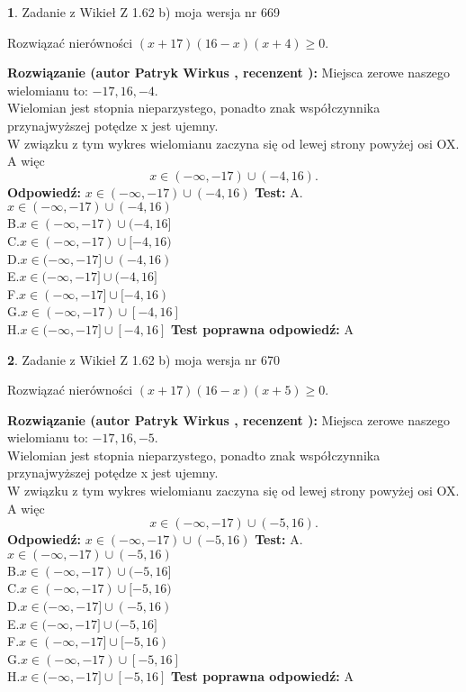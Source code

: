\documentclass[12pt, a4paper]{article}
\theoremstyle{definition} %
\newtheorem{zad}{}
\newcommand{\zadStart}[1]{\begin{zad}#1\newline}
\newcommand{\zadStop}{\end{zad}}
\newcommand{\rozwStart}[2]{\noindent \textbf{Rozwiązanie (autor #1 , recenzent #2): }\newline}
\newcommand{\rozwStop}{\newline}
\newcommand{\odpStart}{\noindent \textbf{Odpowiedź:}\newline}
\newcommand{\odpStop}{\newline}
\newcommand{\testStart}{\noindent \textbf{Test:}\newline}
\newcommand{\testStop}{\newline}
\newcommand{\kluczStart}{\noindent \textbf{Test poprawna odpowiedź:}\newline}
\newcommand{\kluczStop}{\newline}
\begin{document}
\zadStart{Zadanie z Wikieł Z 1.62 b) moja wersja nr 669}

Rozwiązać nierówności $(x+17)(16-x)(x+4)\ge0$.
\zadStop
\rozwStart{Patryk Wirkus}{}
Miejsca zerowe naszego wielomianu to: $-17, 16, -4$.\\
Wielomian jest stopnia nieparzystego, ponadto znak współczynnika przy\linebreak najwyższej potędze x jest ujemny.\\ W związku z tym wykres wielomianu zaczyna się od lewej strony powyżej osi OX. A więc $$x \in (-\infty,-17) \cup (-4,16).$$
\rozwStop
\odpStart
$x \in (-\infty,-17) \cup (-4,16)$
\odpStop
\testStart
A.$x \in (-\infty,-17) \cup (-4,16)$\\
B.$x \in (-\infty,-17) \cup (-4,16]$\\
C.$x \in (-\infty,-17) \cup [-4,16)$\\
D.$x \in (-\infty,-17] \cup (-4,16)$\\
E.$x \in (-\infty,-17] \cup (-4,16]$\\
F.$x \in (-\infty,-17] \cup [-4,16)$\\
G.$x \in (-\infty,-17) \cup [-4,16]$\\
H.$x \in (-\infty,-17] \cup [-4,16]$
\testStop
\kluczStart
A
\kluczStop



\zadStart{Zadanie z Wikieł Z 1.62 b) moja wersja nr 670}

Rozwiązać nierówności $(x+17)(16-x)(x+5)\ge0$.
\zadStop
\rozwStart{Patryk Wirkus}{}
Miejsca zerowe naszego wielomianu to: $-17, 16, -5$.\\
Wielomian jest stopnia nieparzystego, ponadto znak współczynnika przy\linebreak najwyższej potędze x jest ujemny.\\ W związku z tym wykres wielomianu zaczyna się od lewej strony powyżej osi OX. A więc $$x \in (-\infty,-17) \cup (-5,16).$$
\rozwStop
\odpStart
$x \in (-\infty,-17) \cup (-5,16)$
\odpStop
\testStart
A.$x \in (-\infty,-17) \cup (-5,16)$\\
B.$x \in (-\infty,-17) \cup (-5,16]$\\
C.$x \in (-\infty,-17) \cup [-5,16)$\\
D.$x \in (-\infty,-17] \cup (-5,16)$\\
E.$x \in (-\infty,-17] \cup (-5,16]$\\
F.$x \in (-\infty,-17] \cup [-5,16)$\\
G.$x \in (-\infty,-17) \cup [-5,16]$\\
H.$x \in (-\infty,-17] \cup [-5,16]$
\testStop
\kluczStart
A
\kluczStop
\end{document}
